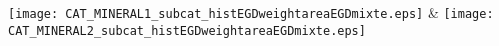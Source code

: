 \texttt{[image: CAT\_MINERAL1\_subcat\_histEGDweightareaEGDmixte.eps]} & \texttt{[image: CAT\_MINERAL2\_subcat\_histEGDweightareaEGDmixte.eps]} \\
